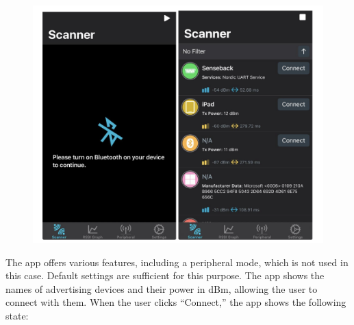 \documentclass{Configuration_Files/PoliMi3i_thesis}
\begin{document}
\begin{figure}[H]
    \centering
    \includegraphics[scale=0.3]{Multicentral/6.png}
    \label{fig:nrf_connect_scanning}
\end{figure}

The app offers various features, including a peripheral mode, which is not used in this case. Default settings are sufficient for this purpose. The app shows the names of advertising devices and their power in dBm, allowing the user to connect with them. When the user clicks “Connect,” the app shows the following state:
\end{document}
